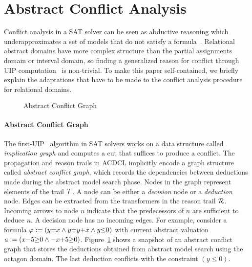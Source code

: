 \section{Abstract Conflict Analysis}\label{sec:conflict}

Conflict analysis in a SAT solver can be seen as abductive 
reasoning which underapproximates a set of models that do not satisfy a 
formula~\cite{sas12,dhk2013-popl}.  
Relational abstract domains have more complex structure than the partial 
assignments domain or interval domain, so finding a generalized reason for 
conflict through UIP computation~\cite{uip} is non-trivial.  To make this paper self-contained, 
we briefly explain the adaptations that have to be made to the conflict analysis procedure for relational domains. %
\begin{figure}[t]
\vspace*{-10ex} %
\caption{\label{conflict} Abstract Conflict Graph}
\end{figure}  

\paragraph {\textbf{Abstract Conflict Graph}}
The first-UIP~\cite{uip,cdcl} algorithm in SAT solvers works on a data structure
called {\em implication graph} and computes a cut that suffices to
produce a conflict.  The propagation and reason trails in ACDCL
implicitly encode a graph structure called {\em abstract conflict
  graph}, which records the dependencies between deductions made
during the abstract model search phase.  Nodes in the graph represent
elements of the trail $\mathcal{T}$.  A node can be either a {\em decision}
node or a {\em deduction} node. Edges can be extracted from the
transformers in the reason trail $\mathcal{R}$.  Incoming arrows to node
$n$ indicate that the predecessors of $n$ are sufficient to deduce
$n$.  A decision node has no incoming edges.  For example, consider a
formula $\varphi:= (y{=}x \wedge y{=}y{+}x \wedge y {\leq} 0)$ with
current abstract valuation $\mathit{a}:= (x{-}5 {\geq} 0 \wedge {-}x{+}5 {\geq}
0)$.  Figure~\ref{conflict} shows a snapshot of an abstract conflict
graph that stores the deductions obtained from abstract model search
using the octagon domain.  The last deduction conflicts with the constraint 
$(y \leq 0)$.

